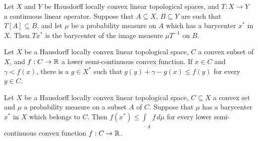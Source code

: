  Let $X$ and $Y$ be Hausdorff locally convex
linear topological spaces, and $T:X\to Y$ a continuous linear operator.
Suppose that $A\subseteq X$, $B\subseteq Y$ are such that
$T[A]\subseteq B$, and let $\mu$ be a probability measure on $A$ which
has a barycenter
$x^*$ in $X$.   Then $Tx^*$ is the barycenter of the image measure
$\mu T^{-1}$ on $B$.


 Let $X$ be a Hausdorff locally convex linear
topological space, $C$ a convex subset of $X$, and $f:C\to\Bbb R$ a lower
semi-continuous convex function.   If $x\in C$ and $\gamma<f(x)$, there
is a $g\in X^*$ such that
$g(y)+\gamma-g(x)\le f(y)$ for every $y\in C$.


 Let $X$ be a Hausdorff locally convex linear
topological space,
$C\subseteq X$ a convex set and $\mu$ a probability measure
on a subset $A$ of $C$.   Suppose that $\mu$ has a barycenter $x^*$ in
$X$ which belongs to $C$.
Then $f(x^*)\le\underline{\int}_Af\,d\mu$ for every
lower semi-continuous convex function $f:C\to\Bbb R$.

